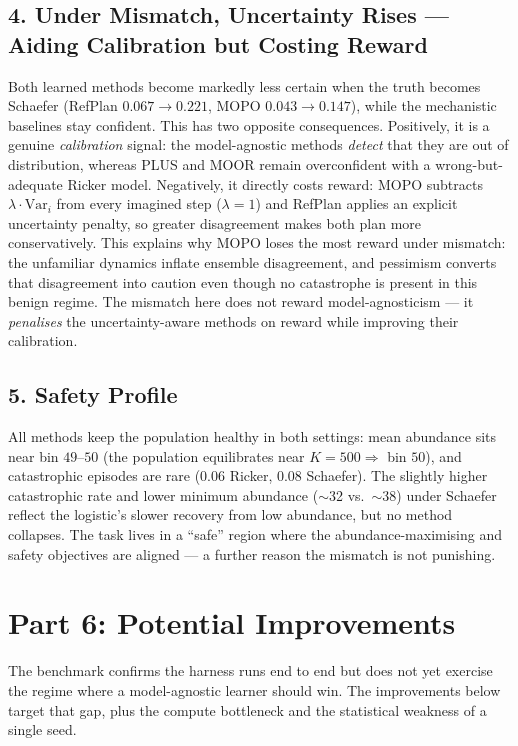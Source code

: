 \documentclass[11pt]{article}
\begin{document}
\subsection*{4. Under Mismatch, Uncertainty Rises --- Aiding Calibration but Costing Reward}
Both learned methods become markedly less certain when the truth becomes Schaefer
(RefPlan $0.067 \to 0.221$, MOPO $0.043 \to 0.147$), while the mechanistic
baselines stay confident. This has two opposite consequences. Positively, it is a
genuine \emph{calibration} signal: the model-agnostic methods \emph{detect} that
they are out of distribution, whereas PLUS and MOOR remain overconfident with a
wrong-but-adequate Ricker model. Negatively, it directly costs reward: MOPO
subtracts $\lambda \cdot \mathrm{Var}_i$ from every imagined step ($\lambda = 1$)
and RefPlan applies an explicit uncertainty penalty, so greater disagreement makes
both plan more conservatively. This explains why MOPO loses the most reward under
mismatch: the unfamiliar dynamics inflate ensemble disagreement, and pessimism
converts that disagreement into caution even though no catastrophe is present in
this benign regime. The mismatch here does not reward model-agnosticism --- it
\emph{penalises} the uncertainty-aware methods on reward while improving their
calibration.

\subsection*{5. Safety Profile}
All methods keep the population healthy in both settings: mean abundance sits near
bin $49$--$50$ (the population equilibrates near $K = 500 \Rightarrow$ bin $50$),
and catastrophic episodes are rare ($0.06$ Ricker, $0.08$ Schaefer). The slightly
higher catastrophic rate and lower minimum abundance ($\sim$32 vs.\ $\sim$38)
under Schaefer reflect the logistic's slower recovery from low abundance, but no
method collapses. The task lives in a ``safe'' region where the abundance-maximising
and safety objectives are aligned --- a further reason the mismatch is not punishing.

\newpage

\section*{Part 6: Potential Improvements}
The benchmark confirms the harness runs end to end but does not yet exercise the
regime where a model-agnostic learner should win. The improvements below target
that gap, plus the compute bottleneck and the statistical weakness of a single
seed.
\end{document}
